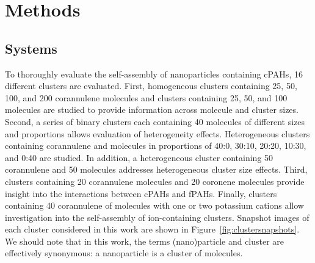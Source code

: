 





\section{Methods}
\subsection{Systems} %
To thoroughly evaluate the self-assembly of nanoparticles containing cPAHs, %
16 different clusters are evaluated. First, homogeneous clusters containing 25, 50, 100, and 200 corannulene molecules and clusters containing 25, 50, and 100  molecules are studied to provide information across molecule and cluster sizes.
Second, a series of binary clusters each containing 40 molecules of different sizes and proportions allows evaluation of heterogeneity effects. Heterogeneous clusters containing corannulene and  molecules in proportions of 40:0, 30:10, 20:20, 10:30, and 0:40 are studied. In addition, a heterogeneous cluster containing 50 corannulene and 50  molecules addresses heterogeneous cluster size effects.
Third, clusters containing 20 corannulene molecules and 20 coronene molecules provide insight into the interactions between cPAHs and fPAHs.
Finally, clusters containing 40 corannulene of  molecules with one or two potassium cations allow investigation into the self-assembly of ion-containing clusters.
Snapshot images of each cluster considered in this work are shown in Figure~\ref{fig:clustersnapshots}. We should note that in this work, the terms (nano)particle and cluster are effectively synonymous: a nanoparticle is a cluster of molecules.

